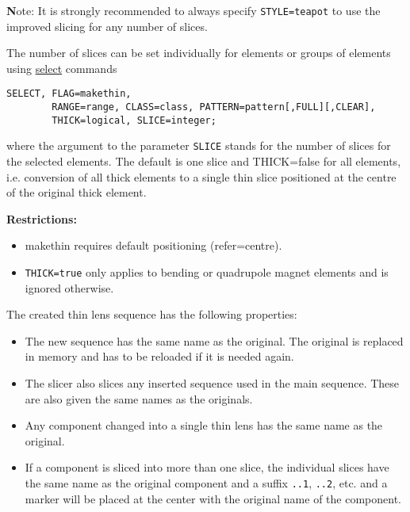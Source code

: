 {\textbf Note:} It is strongly recommended to always specify {\tt STYLE=teapot}  
to use the improved slicing for any number of slices.




The number of slices can be set individually for elements or groups of
elements using
\href{http://mad.web.cern.ch/mad/madx.old/Introduction/select.html}{select}
commands
\begin{verbatim}
SELECT, FLAG=makethin, 
        RANGE=range, CLASS=class, PATTERN=pattern[,FULL][,CLEAR],
        THICK=logical, SLICE=integer;
\end{verbatim}

where the argument to the parameter {\tt SLICE} stands for the number of
slices for the selected elements. The default is one slice and
THICK=false for all elements, i.e. conversion of all thick elements to a
single thin slice positioned at the centre of the original thick
element.

{\bf Restrictions:}
\begin{itemize}
\item makethin requires default positioning (refer=centre). 
\item {\tt THICK=true} only applies to bending or quadrupole magnet
  elements and is ignored otherwise.  
\end{itemize}


The created thin lens sequence has the following properties: 
\begin{itemize}
\item The new sequence has the same name as the original. The original
  is replaced in memory and has to be reloaded if it is needed again. 
\item The slicer also slices any inserted sequence used in the main
  sequence. These are also given the same names as the originals. 
\item Any component changed into a single thin lens has the same name as
  the original. 
\item If a component is sliced into more than one slice, the individual
  slices have the same name as the original component and a suffix 
  {\tt ..1}, {\tt ..2}, etc. and a marker will be placed at the center
  with the original name of the component. 
\end{itemize}



